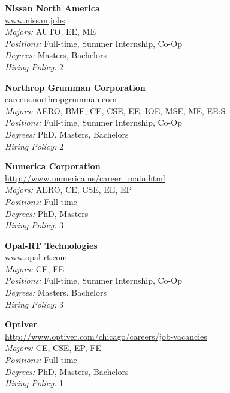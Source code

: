 \documentclass[twoside]{article}
\begin{document}
\begin{center}
\begin{multicols}{3}
\begin{minipage}{.9\columnwidth}{\Large\bf Nissan North America }\\
	\url{www.nissan.jobs}\\
	\emph{Majors:} AUTO, EE, ME\\
	\emph{Positions:} Full-time, Summer Internship, Co-Op\\
	\emph{Degrees:} Masters, Bachelors\\
	\emph{Hiring Policy:} 2\\
\end{minipage}
 
\begin{minipage}{.9\columnwidth}{\Large\bf Northrop Grumman Corporation }\\
	\url{careers.northropgrumman.com}\\
	\emph{Majors:} AERO, BME, CE, CSE, EE, IOE, MSE, ME, EE:S\\
	\emph{Positions:} Full-time, Summer Internship, Co-Op\\
	\emph{Degrees:} PhD, Masters, Bachelors\\
	\emph{Hiring Policy:} 2\\
\end{minipage}
 
\begin{minipage}{.9\columnwidth}{\Large\bf Numerica Corporation }\\
	\url{http://www.numerica.us/career_main.html}\\
	\emph{Majors:} AERO, CE, CSE, EE, EP\\
	\emph{Positions:} Full-time\\
	\emph{Degrees:} PhD, Masters\\
	\emph{Hiring Policy:} 3\\
\end{minipage}
 
\begin{minipage}{.9\columnwidth}{\Large\bf Opal-RT Technologies }\\
	\url{www.opal-rt.com}\\
	\emph{Majors:} CE, EE\\
	\emph{Positions:} Full-time, Summer Internship, Co-Op\\
	\emph{Degrees:} Masters, Bachelors\\
	\emph{Hiring Policy:} 3\\
\end{minipage}
 
\begin{minipage}{.9\columnwidth}{\Large\bf Optiver }\\
	\url{http://www.optiver.com/chicago/careers/job-vacancies}\\
	\emph{Majors:} CE, CSE, EP, FE\\
	\emph{Positions:} Full-time\\
	\emph{Degrees:} PhD, Masters, Bachelors\\
	\emph{Hiring Policy:} 1\\
\end{minipage}
 

\end{multicols}
\end{center}
\end{document}
